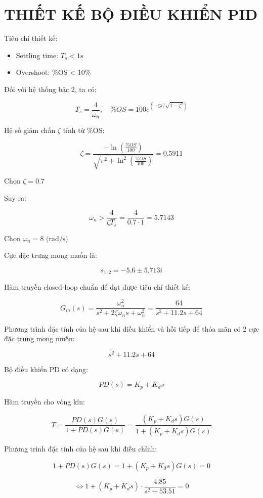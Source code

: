 \chapter{THIẾT KẾ BỘ ĐIỀU KHIỂN PID}
    \hspace*{0.6cm}Tiêu chí thiết kế:
    \begin{itemize}
        \item Settling time: $T_s < 1\text{s}$
        \item Overshoot: \%OS < 10\%
    \end{itemize}

    Đối với hệ thống bậc 2, ta có:

    \[
    T_s = \frac{4}{\omega_n}, \quad \%OS = 100e^{\left(-\zeta\pi / \sqrt{1-\zeta^2}\right)}
    \]

    Hệ số giảm chấn $\zeta$ tính từ \%OS:

    \[
    \zeta = \frac{-\ln\left(\frac{\%OS}{100}\right)}{\sqrt{\pi^2 + \ln^2\left(\frac{\%OS}{100}\right)}} = 0.5911
    \]

    Chọn $\zeta = 0.7$

    Suy ra:

    \[
    \omega_n > \frac{4}{\zeta T_s} = \frac{4}{0.7 \cdot 1} = 5.7143
    \]

    Chọn $\omega_n = 8 \text{ (rad/s)}$

    Cực đặc trưng mong muốn là:

    \[
    s_{1,2} = -5.6 \pm 5.713i
    \]

    Hàm truyền closed-loop chuẩn để đạt được tiêu chí thiết kế:

    \[
    G_m(s) = \frac{\omega_n^2}{s^2 + 2\zeta\omega_n s + \omega_n^2} = \frac{64}{s^2 + 11.2s + 64}
    \]

    Phương trình đặc tính của hệ sau khi điều khiển và hồi tiếp để thỏa mãn có 2 cực đặc trưng mong muốn:

    \[
    s^2 + 11.2s + 64
    \]

    Bộ điều khiển PD có dạng:

    \[
    PD(s) = K_p + K_d s
    \]

    Hàm truyền cho vòng kín:

    \[
    T = \frac{PD(s)G(s)}{1 + PD(s)G(s)} = \frac{(K_p + K_d s)G(s)}{1 + (K_p + K_d s)G(s)}
    \]

    Phương trình đặc tính của hệ sau khi điều chỉnh:

    \[
    1 + PD(s)G(s) = 1 + (K_p + K_d s)G(s) = 0
    \]

    \[
    \Leftrightarrow 1 + (K_p + K_d s) \cdot \frac{4.85}{s^2 + 53.51} = 0
    \]

